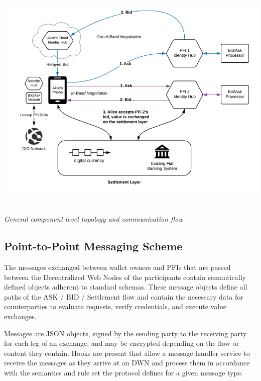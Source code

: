 \documentclass[11pt]{article}
\begin{document}
\begin{center}
  \\ \includegraphics[width=15.61cm,height=11.83cm]{./diagrams/topology.png}{\small \textit{General component-level topology and communication flow}}
\end{center}


\vspace{1\baselineskip}
\subsection{Point-to-Point Messaging Scheme}

\vspace{1\baselineskip}
The messages exchanged between wallet owners and PFIs that are passed between
the Decentralized Web Nodes of the participants contain semantically defined objects adherent to standard schemas. These message objects define all paths of the ASK / BID / Settlement flow and contain the necessary data for counterparties to evaluate requests, verify credentials, and execute value exchanges.

\vspace{1\baselineskip}
Messages are JSON objects, signed by the sending party to the receiving party for each leg of an exchange, and may be encrypted depending on the flow or content they contain. Hooks are present that allow a message handler service to receive the messages as they arrive at an DWN and process them in accordance with the semantics and rule set the protocol defines for a given message type.
\end{document}
